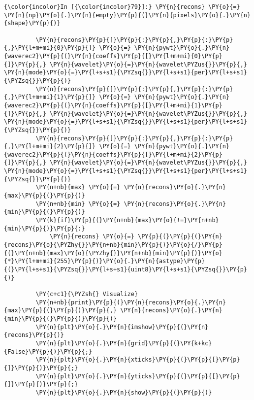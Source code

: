     \begin{Verbatim}[commandchars=\\\{\}]
{\color{incolor}In [{\color{incolor}79}]:} \PY{n}{recons} \PY{o}{=} \PY{n}{np}\PY{o}{.}\PY{n}{empty}\PY{p}{(}\PY{n}{pixels}\PY{o}{.}\PY{n}{shape}\PY{p}{)}
         
         \PY{n}{recons}\PY{p}{[}\PY{p}{:}\PY{p}{,}\PY{p}{:}\PY{p}{,}\PY{l+m+mi}{0}\PY{p}{]} \PY{o}{=} \PY{n}{pywt}\PY{o}{.}\PY{n}{waverec2}\PY{p}{(}\PY{n}{coeffs}\PY{p}{[}\PY{l+m+mi}{0}\PY{p}{]}\PY{p}{,} \PY{n}{wavelet}\PY{o}{=}\PY{n}{wavelet\PYZus{}}\PY{p}{,} \PY{n}{mode}\PY{o}{=}\PY{l+s+s1}{\PYZsq{}}\PY{l+s+s1}{per}\PY{l+s+s1}{\PYZsq{}}\PY{p}{)}
         \PY{n}{recons}\PY{p}{[}\PY{p}{:}\PY{p}{,}\PY{p}{:}\PY{p}{,}\PY{l+m+mi}{1}\PY{p}{]} \PY{o}{=} \PY{n}{pywt}\PY{o}{.}\PY{n}{waverec2}\PY{p}{(}\PY{n}{coeffs}\PY{p}{[}\PY{l+m+mi}{1}\PY{p}{]}\PY{p}{,} \PY{n}{wavelet}\PY{o}{=}\PY{n}{wavelet\PYZus{}}\PY{p}{,} \PY{n}{mode}\PY{o}{=}\PY{l+s+s1}{\PYZsq{}}\PY{l+s+s1}{per}\PY{l+s+s1}{\PYZsq{}}\PY{p}{)}
         \PY{n}{recons}\PY{p}{[}\PY{p}{:}\PY{p}{,}\PY{p}{:}\PY{p}{,}\PY{l+m+mi}{2}\PY{p}{]} \PY{o}{=} \PY{n}{pywt}\PY{o}{.}\PY{n}{waverec2}\PY{p}{(}\PY{n}{coeffs}\PY{p}{[}\PY{l+m+mi}{2}\PY{p}{]}\PY{p}{,} \PY{n}{wavelet}\PY{o}{=}\PY{n}{wavelet\PYZus{}}\PY{p}{,} \PY{n}{mode}\PY{o}{=}\PY{l+s+s1}{\PYZsq{}}\PY{l+s+s1}{per}\PY{l+s+s1}{\PYZsq{}}\PY{p}{)}
         \PY{n+nb}{max} \PY{o}{=} \PY{n}{recons}\PY{o}{.}\PY{n}{max}\PY{p}{(}\PY{p}{)}
         \PY{n+nb}{min} \PY{o}{=} \PY{n}{recons}\PY{o}{.}\PY{n}{min}\PY{p}{(}\PY{p}{)}
         \PY{k}{if}\PY{p}{(}\PY{n+nb}{max}\PY{o}{!=}\PY{n+nb}{min}\PY{p}{)}\PY{p}{:}
             \PY{n}{recons} \PY{o}{=} \PY{p}{(}\PY{p}{(}\PY{n}{recons}\PY{o}{\PYZhy{}}\PY{n+nb}{min}\PY{p}{)}\PY{o}{/}\PY{p}{(}\PY{n+nb}{max}\PY{o}{\PYZhy{}}\PY{n+nb}{min}\PY{p}{)}\PY{o}{*}\PY{l+m+mi}{255}\PY{p}{)}\PY{o}{.}\PY{n}{astype}\PY{p}{(}\PY{l+s+s1}{\PYZsq{}}\PY{l+s+s1}{uint8}\PY{l+s+s1}{\PYZsq{}}\PY{p}{)}
                               
         \PY{c+c1}{\PYZsh{} Visualize}
         \PY{n+nb}{print}\PY{p}{(}\PY{n}{recons}\PY{o}{.}\PY{n}{max}\PY{p}{(}\PY{p}{)}\PY{p}{,} \PY{n}{recons}\PY{o}{.}\PY{n}{min}\PY{p}{(}\PY{p}{)}\PY{p}{)}
         \PY{n}{plt}\PY{o}{.}\PY{n}{imshow}\PY{p}{(}\PY{n}{recons}\PY{p}{)}
         \PY{n}{plt}\PY{o}{.}\PY{n}{grid}\PY{p}{(}\PY{k+kc}{False}\PY{p}{)}\PY{p}{;}
         \PY{n}{plt}\PY{o}{.}\PY{n}{xticks}\PY{p}{(}\PY{p}{[}\PY{p}{]}\PY{p}{)}\PY{p}{;}
         \PY{n}{plt}\PY{o}{.}\PY{n}{yticks}\PY{p}{(}\PY{p}{[}\PY{p}{]}\PY{p}{)}\PY{p}{;}
         \PY{n}{plt}\PY{o}{.}\PY{n}{show}\PY{p}{(}\PY{p}{)}
\end{Verbatim}


